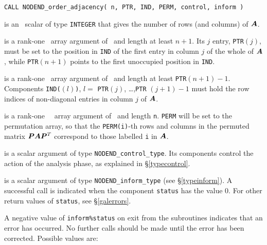 \documentclass{galahad}
\newcommand{\packagename}{NODEND}
\begin{document}
\hskip0.5in
{\tt CALL \packagename\_order\_adjacency( n, PTR, IND, PERM, control, inform )}
\begin{description}
 is an \intentin\ scalar of type  {\tt INTEGER} that gives the
number of rows (and columns) of ${\bm{A}}$.

 is a rank-one \integer\ array argument of \intentin\ and length 
 at least $n+1$. Its $j$ entry, {\tt PTR}$(j)$, must be set to the position
 in {\tt IND} of the first entry in column $j$ of the whole of ${\bm{A}}$,
 while {\tt PTR}$(n+1)$ points to the first unoccupied position in {\tt IND}.

 is a rank-one \integer\ array argument of \intentin\ and length 
 at least  {\tt PTR}$(n+1)-1$. Components
 {\tt IND(}$(l)${\tt )}, $l =$ {\tt PTR}$(j)$, \ldots ,{\tt PTR} $(j+1)-1$
 must hold the row indices of non-diagonal entries in column $j$ of ${\bm{A}}$.

 is a rank-one \integer\ \intentout\ array argument
 of \intentout\ and length {\tt n}.
 {\tt PERM} will be set to the permutation array, so that the 
 {\tt PERM(i)}-th rows and columns in the permuted matrix 
 ${\bm{P}} {\bm{A}} {\bm{P}}^T$ correspond to those labelled {\tt i} in ${\bm{A}}$.

 is a scalar \intentout argument of type
{\tt \packagename\_control\_type}. Its components control the action
of the analysis phase, as explained in
\S\ref{typecontrol}.

 is a scalar \intentout argument of type
{\tt \packagename\_inform\_type}
(see \S\ref{typeinform}).
A successful call is indicated when the  component {\tt status} has the value 0.
For other return values of {\tt status}, see \S\ref{galerrors}.
\end{description}


\galerrors
A negative value of {\tt inform\%status} on exit from the subroutines
indicates that an error has occurred. No further calls should be made
until the error has been corrected. Possible values are:
\end{document}
